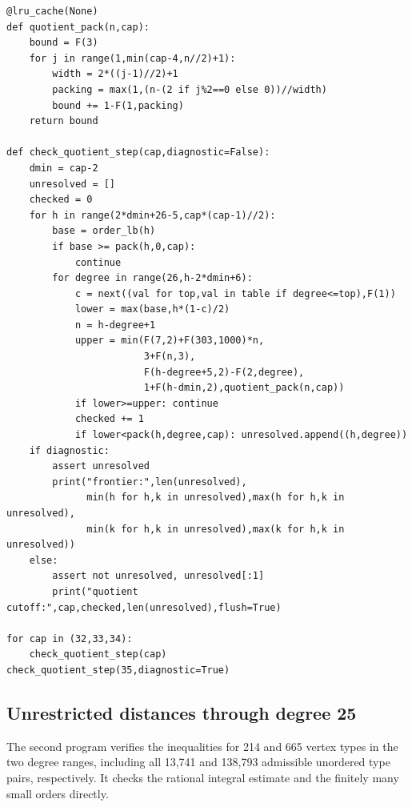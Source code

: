 \documentclass[11pt,a4paper]{article}
\begin{document}
\begin{Verbatim}[fontsize=\scriptsize]
@lru_cache(None)
def quotient_pack(n,cap):
    bound = F(3)
    for j in range(1,min(cap-4,n//2)+1):
        width = 2*((j-1)//2)+1
        packing = max(1,(n-(2 if j%2==0 else 0))//width)
        bound += 1-F(1,packing)
    return bound

def check_quotient_step(cap,diagnostic=False):
    dmin = cap-2
    unresolved = []
    checked = 0
    for h in range(2*dmin+26-5,cap*(cap-1)//2):
        base = order_lb(h)
        if base >= pack(h,0,cap):
            continue
        for degree in range(26,h-2*dmin+6):
            c = next((val for top,val in table if degree<=top),F(1))
            lower = max(base,h*(1-c)/2)
            n = h-degree+1
            upper = min(F(7,2)+F(303,1000)*n,
                        3+F(n,3),
                        F(h-degree+5,2)-F(2,degree),
                        1+F(h-dmin,2),quotient_pack(n,cap))
            if lower>=upper: continue
            checked += 1
            if lower<pack(h,degree,cap): unresolved.append((h,degree))
    if diagnostic:
        assert unresolved
        print("frontier:",len(unresolved),
              min(h for h,k in unresolved),max(h for h,k in unresolved),
              min(k for h,k in unresolved),max(k for h,k in unresolved))
    else:
        assert not unresolved, unresolved[:1]
        print("quotient cutoff:",cap,checked,len(unresolved),flush=True)

for cap in (32,33,34):
    check_quotient_step(cap)
check_quotient_step(35,diagnostic=True)
\end{Verbatim}

\subsection*{Unrestricted distances through degree 25}
The second program verifies the inequalities for 214 and 665 vertex types in the two degree ranges, including all 13,741 and 138,793 admissible unordered type pairs, respectively. It checks the rational integral estimate and the finitely many small orders directly.
\end{document}
